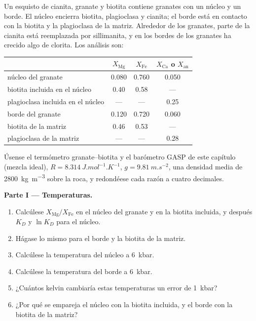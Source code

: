 \begin{problem}
\label{pb:b2:pt-paths:1}
Un esquisto de cianita, granate y biotita contiene granates con un núcleo y un borde. El núcleo encierra
biotita, plagioclasa y cianita; el borde está en contacto con la biotita y la plagioclasa de la
matriz. Alrededor de los granates, parte de la cianita está reemplazada por sillimanita, y en los bordes de
los granates ha crecido algo de clorita. Los análisis son:
\begin{center}
\small
\begin{tabular}{@{}lccc@{}}
\hline
 & $X_{\text{Mg}}$ & $X_{\text{Fe}}$ & $X_{\text{Ca}}$ o $X_{\text{an}}$\\
\hline
núcleo del granate & 0.080 & 0.760 & 0.050\\
biotita incluida en el núcleo & 0.40 & 0.58 & ---\\
plagioclasa incluida en el núcleo & --- & --- & 0.25\\
borde del granate & 0.120 & 0.720 & 0.060\\
biotita de la matriz & 0.46 & 0.53 & ---\\
plagioclasa de la matriz & --- & --- & 0.28\\
\hline
\end{tabular}
\end{center}
Úsense el termómetro granate--biotita y el barómetro GASP de este capítulo (mezcla ideal),
$R = \qty{8.314}{J.mol^{-1}.K^{-1}}$, $g = \qty{9.81}{m.s^{-2}}$, una densidad media de
\qty{2800}{kg.m^{-3}} sobre la roca, y redondéese cada razón a cuatro decimales.

\noindent\textbf{Parte I --- Temperaturas.}
\begin{enumerate}
\item Calcúlese $X_{\text{Mg}}/X_{\text{Fe}}$ en el núcleo del granate y en la biotita
incluida, y después $K_D$ y $\ln K_D$ para el núcleo.
\item Hágase lo mismo para el borde y la biotita de la matriz.
\item Calcúlese la temperatura del núcleo a \qty{6}{kbar}.
\item Calcúlese la temperatura del borde a \qty{6}{kbar}.
\item ¿Cuántos kelvin cambiaría estas temperaturas un error de \qty{1}{kbar}?
\item ¿Por qué se empareja el núcleo con la biotita incluida, y el borde con la biotita de la
matriz?
\end{enumerate}


\end{problem}
